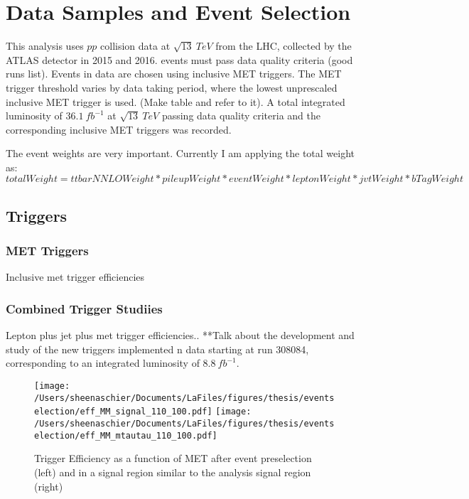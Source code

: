 \chapter{Data Samples and Event Selection}
This analysis uses $pp$ collision data at $\sqrt{13}~TeV$ from the LHC, collected by the ATLAS detector in 2015 and 2016. events must pass data quality criteria (good runs list).  Events in data are chosen using inclusive MET triggers.  The MET trigger threshold varies by data taking period, where the lowest unprescaled inclusive MET trigger is used.  (Make table and refer to it). A total integrated luminosity of $36.1~fb^{-1}$ at $\sqrt{13} ~ TeV$ passing data quality criteria and the corresponding inclusive MET triggers was recorded.



The event weights are very important.  Currently I am applying the total weight as:
\begin{equation}
\label{eq:weight}
totalWeight = ttbarNNLOWeight*pileupWeight*eventWeight*leptonWeight*jvtWeight*bTagWeight
\end{equation}

\section{Triggers}
\label{sec:eff}
\subsection{MET Triggers}
\label{sec:met}
Inclusive met trigger efficiencies

\subsection{Combined Trigger Studiies}
Lepton plus jet plus met trigger efficiencies..  
**Talk about the development and study of the new triggers implemented n data starting at run 308084, corresponding to an integrated luminosity of $8.8~fb^{-1}$.

  \begin{figure}[tbp]
     \texttt{[image: /Users/sheenaschier/Documents/LaFiles/figures/thesis/eventselection/eff\_MM\_signal\_110\_100.pdf]}
       \texttt{[image: /Users/sheenaschier/Documents/LaFiles/figures/thesis/eventselection/eff\_MM\_mtautau\_110\_100.pdf]}\\
   \caption{Trigger Efficiency as a function of MET after event preselection (left) and in a signal region similar to the analysis signal region (right)}
   \label{fig:TrigEff1}
 \end{figure}
 
